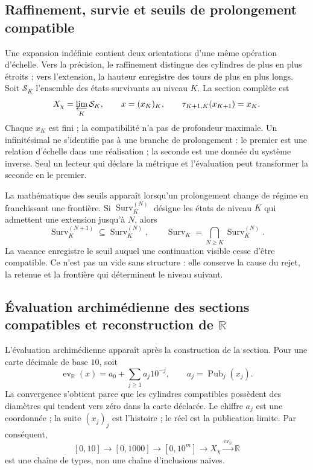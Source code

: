 \subsection{Raffinement, survie et seuils de prolongement compatible}

Une expansion indéfinie contient deux orientations d'une même opération
d'échelle. Vers la précision, le raffinement distingue des cylindres de plus en
plus étroits ; vers l'extension, la hauteur enregistre des tours de plus en plus
longs. Soit \(\mathcal S_K\) l'ensemble des états survivants au niveau
\(K\). La section complète est
\begin{equation}\label{p12-83-c0-s2:eq:amp-seccion-infinita}
 X_\chi=\varprojlim_K\mathcal S_K,
 \qquad
 x=(x_K)_K,
 \qquad \tau_{K+1,K}(x_{K+1})=x_K.
\end{equation}
Chaque \(x_K\) est fini ; la compatibilité n'a pas de profondeur maximale.
Un infinitésimal ne s'identifie pas à une branche de prolongement : le premier
est une relation d'échelle dans une réalisation ; la seconde est une donnée du
système inverse. Seul un lecteur qui déclare la métrique et l'évaluation peut
transformer la seconde en le premier.

La mathématique des seuils apparaît lorsqu'un prolongement change de régime
en franchissant une frontière. Si
\(\operatorname{Surv}_K^{(N)}\) désigne les états de niveau \(K\) qui admettent une
extension jusqu'à \(N\), alors
\begin{equation}\label{p12-83-c0-s2:eq:amp-horizontes-supervivencia}
 \operatorname{Surv}_K^{(N+1)}\subseteq
 \operatorname{Surv}_K^{(N)},
 \qquad
 \operatorname{Surv}_K=\bigcap_{N\geq K}
 \operatorname{Surv}_K^{(N)}.
\end{equation}
La vacance enregistre le seuil auquel une continuation visible cesse
d'être compatible. Ce n'est pas un vide sans structure : elle conserve la cause du
rejet, la retenue et la frontière qui déterminent le niveau suivant.

\subsection{Évaluation archimédienne des sections compatibles et reconstruction de \(\mathbb R\)}

L'évaluation archimédienne apparaît après la construction de la section. Pour
une carte décimale de base \(10\), soit
\begin{equation}\label{p12-83-c0-s2:eq:amp-evaluacion-arquimediana}
 \operatorname{ev}_{\mathbb R}(x)
 =a_0+\sum_{j\geq1}a_j10^{-j},
 \qquad a_j=\operatorname{Pub}_j(x_j).
\end{equation}
La convergence s'obtient parce que les cylindres compatibles possèdent des diamètres
qui tendent vers zéro dans la carte déclarée. Le chiffre \(a_j\) est une coordonnée ;
la suite \((x_j)_j\) est l'histoire ; le réel est la publication limite.
Par conséquent,
\begin{equation}\label{p12-83-c0-s2:eq:amp-cadena-recta-R}
 [0,10]\longrightarrow[0,1000]
 \longrightarrow[0,10^m]
 \longrightarrow X_\chi
 \xrightarrow{\operatorname{ev}_{\mathbb R}}\mathbb R
\end{equation}
est une chaîne de types, non une chaîne d'inclusions naïves.

